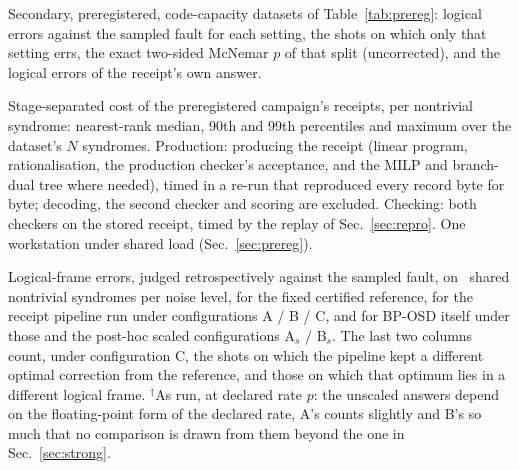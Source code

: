 \documentclass[aps,pra,twocolumn,superscriptaddress,nofootinbib,longbibliography,floatfix]{revtex4-2}
\begin{document}
\begin{table}[tbp]
\caption{Secondary, preregistered, code-capacity datasets of Table~\ref{tab:prereg}: logical errors against the sampled fault for each setting, the shots on which only that setting errs, the exact two-sided McNemar $p$ of that split (uncorrected), and the logical errors of the receipt's own answer.}
\label{tab:prereglogical}
\small\setlength{\tabcolsep}{3pt}

\end{table}

\begin{table}[tbp]
\caption{Stage-separated cost of the preregistered campaign's receipts, per nontrivial syndrome: nearest-rank median, 90th and 99th percentiles and maximum over the dataset's $N$ syndromes. Production: producing the receipt (linear program, rationalisation, the production checker's acceptance, and the MILP and branch-dual tree where needed), timed in a re-run that reproduced every record byte for byte; decoding, the second checker and scoring are excluded. Checking: both checkers on the stored receipt, timed by the replay of Sec.~\ref{sec:repro}. One workstation under shared load (Sec.~\ref{sec:prereg}).}
\label{tab:costs}
\small\setlength{\tabcolsep}{3pt}

\end{table}

\begin{table}[tbp]
\caption{Logical-frame errors, judged retrospectively against the sampled fault, on \StrongShots\ shared nontrivial syndromes per noise level, for the fixed certified reference, for the receipt pipeline run under configurations A / B / C, and for BP-OSD itself under those and the post-hoc scaled configurations A$_s$ / B$_s$. The last two columns count, under configuration C, the shots on which the pipeline kept a different optimal correction from the reference, and those on which that optimum lies in a different logical frame. $^\dagger$As run, at declared rate $p$: the unscaled answers depend on the floating-point form of the declared rate, A's counts slightly and B's so much that no comparison is drawn from them beyond the one in Sec.~\ref{sec:strong}.}
\label{tab:strong}
\small\setlength{\tabcolsep}{2.5pt}

\end{table}
\end{document}
